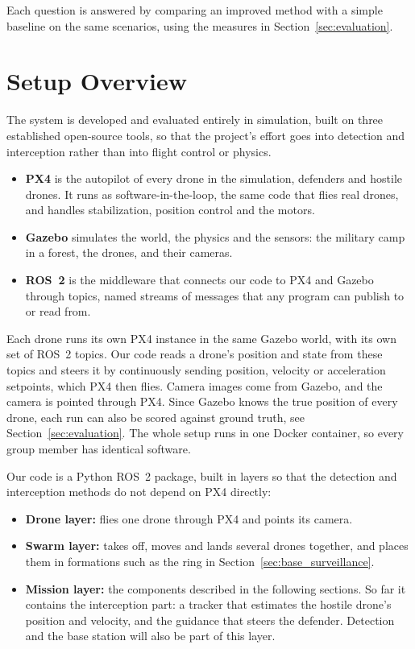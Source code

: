 \documentclass{article}
\begin{document}
Each question is answered by comparing an improved method with a simple
baseline on the same scenarios, using the measures in
Section~\ref{sec:evaluation}. 


\newpage
\section{Setup Overview} \label{sec:setup_overview}
The system is developed and evaluated entirely in simulation, built on three
established open-source tools, so that the project's effort goes into
detection and interception rather than into flight control or physics.

\begin{itemize}
    \item \textbf{PX4} \cite{meier2015px4}
          is the autopilot of every drone in the simulation,
          defenders and hostile drones. It runs as software-in-the-loop,
          the same code that flies real drones, and handles stabilization,
          position control and the motors.
    \item \textbf{Gazebo} \cite{koenig2004gazebo} 
          simulates the world, the
          physics and the sensors: the military camp in a forest, the drones,
          and their cameras.
    \item \textbf{ROS~2} \cite{macenski2022ros2} 
          is the middleware that
          connects our code to PX4 and Gazebo through topics, named streams
          of messages that any program can publish to or read from.
\end{itemize}

Each drone runs its own PX4 instance in the same Gazebo world, with its own
set of ROS~2 topics. Our code reads a drone's position and state from these topics and steers it by continuously sending position, velocity or acceleration setpoints, which PX4 then
flies. Camera images come from Gazebo, and the camera is pointed through PX4. Since Gazebo knows the true position of every drone, each run can also be scored against ground truth, see Section~\ref{sec:evaluation}. The whole setup runs in one Docker container, so every group member has identical software.

Our code is a Python ROS~2 package, built in layers so that the detection
and interception methods do not depend on PX4 directly:

\begin{itemize}
    \item \textbf{Drone layer:} flies one drone through PX4 and points its camera.
    \item \textbf{Swarm layer:} takes off, moves and lands several drones
          together, and places them in formations such as the ring in
          Section~\ref{sec:base_surveillance}.
    \item \textbf{Mission layer:} the components described in the following
          sections. So far it contains the interception part: a tracker that
          estimates the hostile drone's position and velocity, and the
          guidance that steers the defender. Detection and the base station will also be part of this layer.
\end{itemize}
\end{document}
